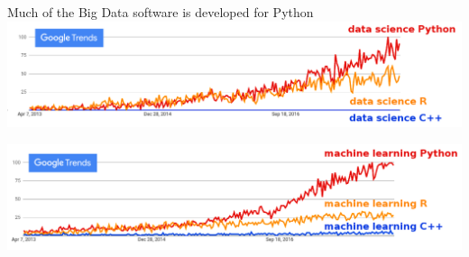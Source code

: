 \documentclass[aspectratio=169]{beamer}
\begin{document}


\begin{frame}{Much of the Big Data software is developed for Python}
\vspace{0.5 cm}
\includegraphics[width=\linewidth]{python-r-cpp-googletrends-datascience.png}

\vspace{1 cm}
\includegraphics[width=\linewidth]{python-r-cpp-googletrends-machinelearning.png}
\end{frame}
\end{document}
